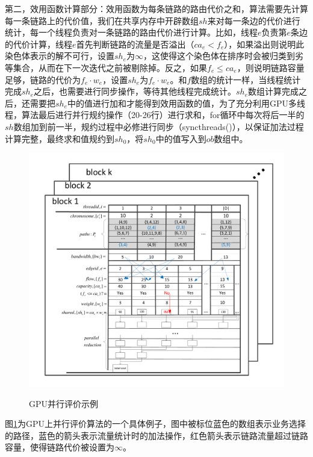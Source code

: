 第二，效用函数计算部分：效用函数为每条链路的路由代价之和，算法需要先计算每一条链路上的代价值，我们在共享内存中开辟数组$sh$来对每一条边的代价进行统计，每一个线程负责对一条链路的路由代价进行计算。比如，线程$e$负责第$e$条边的代价计算，线程$e$首先判断链路的流量是否溢出（$ca_e<f_e$），如果溢出则说明此染色体表示的解不可行，设置$sh_e$为$\infty$，这使得这个染色体在排序时会被归类到劣等集合，从而在下一次迭代之前被剔除掉。反之，如果$f_e \le ca_e$，则说明链路容量足够，链路的代价为$f_e \cdot w_e$，设置$sh_e$为$f_e \cdot w_e$。和$f$数组的统计一样，当线程统计完成$sh_e$之后，也需要进行同步操作，等待其他线程完成统计。$sh_e$数组计算完成之后，还需要把$sh_e$中的值进行加和才能得到效用函数的值，为了充分利用GPU多线程，算法最后进行并行规约操作（20-26行）进行求和，for循环中每次将后一半的$sh$数组加到前一半，规约过程中必修进行同步（syncthreads()），以保证加法过程计算完整，最终求和值规约到$sh_0$，将$sh_0$中的值写入到$ob$数组中。
\begin{figure}
\setlength{\abovecaptionskip}{-0.5cm}
\begin{center}
{\includegraphics[width=1 \textwidth]{figures/GPUfitness.pdf}}
\end{center}
\caption{{\footnotesize{GPU并行评价示例}}}
\label{fitness}
\end{figure}

图\ref{fitness}为GPU上并行评价算法的一个具体例子，图中被标位蓝色的数组表示业务选择的路径，蓝色的箭头表示流量统计时的加法操作，红色箭头表示链路流量超过链路容量，使得链路代价被设置为$\infty$。
